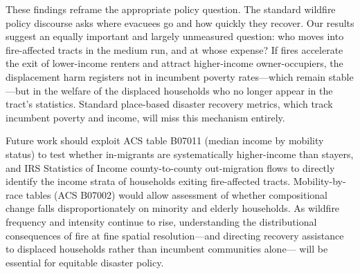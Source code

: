 \documentclass[12pt]{article}
\begin{document}
These findings reframe the appropriate policy question.
The standard wildfire policy discourse asks where evacuees go and
how quickly they recover.
Our results suggest an equally important and largely unmeasured question:
who moves into fire-affected tracts in the medium run, and at whose
expense?
If fires accelerate the exit of lower-income renters and attract
higher-income owner-occupiers, the displacement harm registers
not in incumbent poverty rates---which remain stable---but in the
welfare of the displaced households who no longer appear in
the tract's statistics.
Standard place-based disaster recovery metrics, which track incumbent
poverty and income, will miss this mechanism entirely.

Future work should exploit ACS table B07011 (median income by
mobility status) to test whether in-migrants are systematically
higher-income than stayers, and IRS Statistics of Income
county-to-county out-migration flows to directly identify the
income strata of households exiting fire-affected tracts.
Mobility-by-race tables (ACS B07002) would allow assessment of
whether compositional change falls disproportionately on minority
and elderly households.
As wildfire frequency and intensity continue to rise,
understanding the distributional consequences of fire
at fine spatial resolution---and directing recovery assistance
to displaced households rather than incumbent communities alone---
will be essential for equitable disaster policy.



\clearpage
\end{document}
